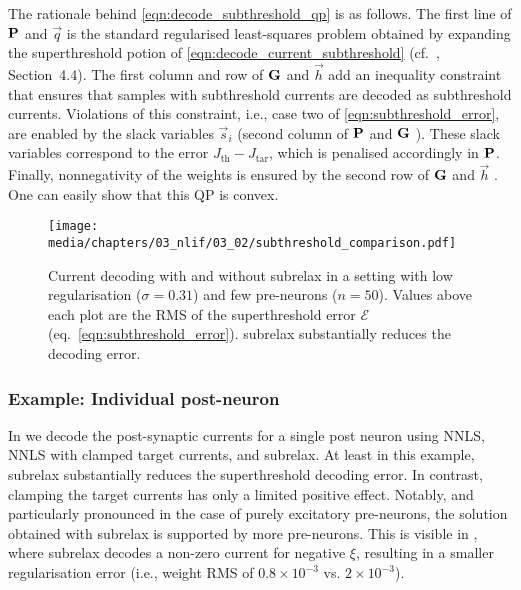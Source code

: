 The rationale behind \cref{eqn:decode_subthreshold_qp} is as follows.
The first line of $\mathbf{P}$ and $\vec q$
is the standard regularised least-squares problem obtained by expanding the superthreshold potion of \cref{eqn:decode_current_subthreshold} (cf.~\cite{boyd2004convex}, Section~4.4).
The first column and row of $\mathbf{G}$ and $\vec h$
add an inequality constraint that ensures that samples with subthreshold currents are decoded as subthreshold currents.
Violations of this constraint, i.e., case two of \cref{eqn:subthreshold_error}, are enabled by the slack variables $\vec s_i$ (second column of $\mathbf{P}$ and $\mathbf{G}$%
).
These slack variables correspond to the error $J_\mathrm{th} - J_\mathrm{tar}$, which is penalised accordingly in $\mathbf{P}$.
Finally, nonnegativity of the weights is ensured by the second row of $\mathbf{G}$ and $\vec h$%
. One can easily show that this QP is convex.
\endgroup

\begin{figure}
	\texttt{[image: media/chapters/03\_nlif/03\_02/subthreshold\_comparison.pdf]}%
	{\label{fig:subthreshold_comparison_a}}%
	{\label{fig:subthreshold_comparison_b}}%
	{\label{fig:subthreshold_comparison_c}}%
	{\label{fig:subthreshold_comparison_d}}%
	\caption[Current decoding with and without subthreshold relaxation]{Current decoding with and without \gls{subrelax} in a setting with low regularisation ($\sigma = 0.31$) and few pre-neurons ($n = 50$).
	Values above each plot are the RMS of the superthreshold error ${\mathcal{E}}$ (eq.~\ref{eqn:subthreshold_error}).
	\Gls{subrelax} substantially reduces the decoding error.	
	}
	\label{fig:subthreshold_comparison}
\end{figure}

\subsubsection{Example: Individual post-neuron}
In  we decode the post-synaptic currents for a single post neuron using NNLS, NNLS with clamped target currents, and \gls{subrelax}.
At least in this example, \gls{subrelax} substantially reduces the superthreshold decoding error.
In contrast, clamping the target currents has only a limited positive effect.
Notably, and particularly pronounced in the case of purely excitatory pre-neurons, the solution obtained with \gls{subrelax} is supported by more pre-neurons.
This is visible in , where \gls{subrelax} decodes a non-zero current for negative $\xi$, resulting in a smaller regularisation error (i.e., weight RMS of $0.8 \times 10^{-3}$ vs. $2 \times{10}^{-3}$).

